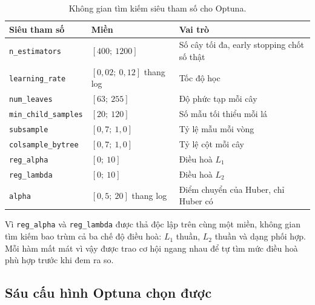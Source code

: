 \documentclass[12pt, a4paper]{report}
\begin{document}
\begin{table}[htbp]
\centering
\caption{Không gian tìm kiếm siêu tham số cho Optuna.}
\label{tab:mien_optuna}
\small
\begin{tabular}{l l l}
\toprule
\textbf{Siêu tham số} & \textbf{Miền} & \textbf{Vai trò} \\
\midrule
\texttt{n\_estimators}     & $[400;\ 1200]$ & Số cây tối đa, early stopping chốt số thật \\
\texttt{learning\_rate}    & $[0{,}02;\ 0{,}12]$ thang log & Tốc độ học \\
\texttt{num\_leaves}       & $[63;\ 255]$ & Độ phức tạp mỗi cây \\
\texttt{min\_child\_samples} & $[20;\ 120]$ & Số mẫu tối thiểu mỗi lá \\
\texttt{subsample}         & $[0{,}7;\ 1{,}0]$ & Tỷ lệ mẫu mỗi vòng \\
\texttt{colsample\_bytree} & $[0{,}7;\ 1{,}0]$ & Tỷ lệ cột mỗi cây \\
\texttt{reg\_alpha}        & $[0;\ 10]$ & Điều hoà $L_1$ \\
\texttt{reg\_lambda}       & $[0;\ 10]$ & Điều hoà $L_2$ \\
\texttt{alpha}             & $[0{,}5;\ 20]$ thang log & Điểm chuyển của Huber, chỉ Huber có \\
\bottomrule
\end{tabular}
\end{table}

Vì \texttt{reg\_alpha} và \texttt{reg\_lambda} được thả độc lập trên cùng một miền, không gian
tìm kiếm bao trùm cả ba chế độ điều hoà: $L_1$ thuần, $L_2$ thuần và dạng phối hợp. Mỗi hàm mất
mát vì vậy được trao cơ hội ngang nhau để tự tìm mức điều hoà phù hợp trước khi đem ra so.

\FloatBarrier
\subsection{Sáu cấu hình Optuna chọn được}
\end{document}
